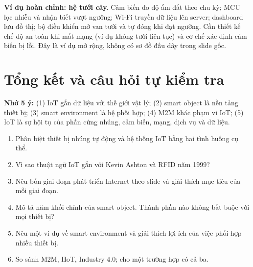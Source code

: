 \begin{expandbox}
\textbf{Ví dụ hoàn chỉnh: hệ tưới cây.} Cảm biến đo độ ẩm đất theo chu kỳ; MCU lọc nhiễu và nhận biết vượt ngưỡng; Wi-Fi truyền dữ liệu lên server; dashboard lưu đồ thị; bộ điều khiển mở van tưới và tự đóng khi đạt ngưỡng. Cần thiết kế chế độ an toàn khi mất mạng (ví dụ không tưới liên tục) và cơ chế xác định cảm biến bị lỗi. Đây là ví dụ mở rộng, không có sơ đồ đấu dây trong slide gốc.
\end{expandbox}

\section{Tổng kết và câu hỏi tự kiểm tra}
\begin{notebox}
\textbf{Nhớ 5 ý:} (1) IoT gắn dữ liệu với thế giới vật lý; (2) smart object là nền tảng thiết bị; (3) smart environment là hệ phối hợp; (4) M2M khác phạm vi IoT; (5) IoT là sự hội tụ của phần cứng nhúng, cảm biến, mạng, dịch vụ và dữ liệu.
\end{notebox}
\begin{enumerate}
\item Phân biệt thiết bị nhúng tự động và hệ thống IoT bằng hai tình huống cụ thể.
\item Vì sao thuật ngữ IoT gắn với Kevin Ashton và RFID năm 1999?
\item Nêu bốn giai đoạn phát triển Internet theo slide và giải thích mục tiêu của mỗi giai đoạn.
\item Mô tả năm khối chính của smart object. Thành phần nào không bắt buộc với mọi thiết bị?
\item Nêu một ví dụ về smart environment và giải thích lợi ích của việc phối hợp nhiều thiết bị.
\item So sánh M2M, IIoT, Industry 4.0; cho một trường hợp có cả ba.
\end{enumerate}